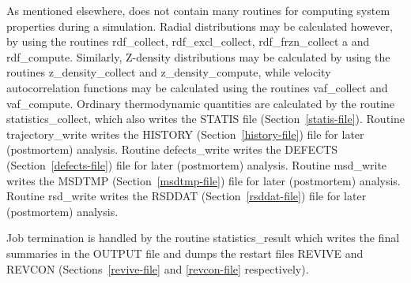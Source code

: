 As mentioned elsewhere, \D does not contain many routines for
computing system properties during a simulation.  Radial
distributions may be calculated however, by using the routines
{\sc rdf\_collect}, {\sc rdf\_excl\_collect},
{\sc rdf\_frzn\_collect} a and {\sc rdf\_compute}.
Similarly, Z-density distributions may be calculated by using the
routines {\sc z\_density\_collect} and {\sc z\_density\_compute},
while velocity autocorrelation functions may be calculated using
the routines {\sc vaf\_collect} and {\sc vaf\_compute}.
Ordinary thermodynamic quantities are calculated by the routine
{\sc statistics\_collect}, which also writes the STATIS file
(Section~\ref{statis-file}).  Routine {\sc trajectory\_write} writes the
HISTORY (Section~\ref{history-file}) file for later (postmortem)
analysis.  Routine {\sc defects\_write} writes the DEFECTS
(Section~\ref{defects-file}) file for later (postmortem) analysis.
Routine {\sc msd\_write} writes the MSDTMP (Section~\ref{msdtmp-file})
file for later (postmortem) analysis.  Routine {\sc rsd\_write}
writes the RSDDAT (Section~\ref{rsddat-file}) file for later
(postmortem) analysis.

Job termination is handled by the routine {\sc statistics\_result}
which writes the final summaries in the OUTPUT file and dumps the
restart files REVIVE and REVCON (Sections~\ref{revive-file} and
\ref{revcon-file} respectively).
